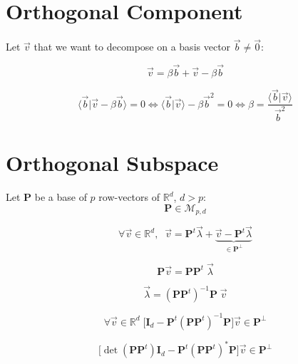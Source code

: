 \documentclass[aps,12pt]{revtex4}
\begin{document}
\section{Orthogonal Component}
Let $\vec{v}$ that we want to decompose on a basis vector $\vec{b} \not= \vec{0}$:

\begin{equation}
	\vec{v} = \beta \vec{b} + \vec{v} - \beta \vec{b}
\end{equation}

\begin{equation}
	\langle	\vec{b} \vert \vec{v} - \beta \vec{b}\rangle = 0 \iff \langle \vec{b} \vert \vec{v} \rangle - \beta \vec{b}^2 = 0
	\iff \beta = \dfrac{\langle \vec{b} \vert \vec{v} \rangle}{\vec{b}^2}
\end{equation}


\section{Orthogonal Subspace}

Let $\bm{P}$ be a base of $p$ row-vectors of $\mathbb{R}^d$, $d>p$:
\begin{equation}
	\bm{P} \in \mathcal{M}_{p,d}
\end{equation}

\begin{equation}
\forall \vec{v} \in \mathbb{R}^d,\;\; \vec{v} = \bm{P}^t \vec{\lambda} +  \underbrace{\vec v  - \bm{P}^t \vec \lambda}_{\in \bm{P}^\perp} %
\end{equation}

\begin{equation}
	\bm{P} \vec v = \bm{P} \bm{P}^t \; \vec{\lambda}
\end{equation}

\begin{equation}
	\vec \lambda = (\bm{P} \bm{P}^t)^{-1} \bm{P}\; \vec v 
\end{equation}

\begin{equation}
	\forall \vec{v} \in  \mathbb{R}^d \; \lbrack \bm{I}_d - \bm{P}^t (\bm{P} \bm{P}^t)^{-1} \bm{P} \rbrack \vec v \in \bm{P}^\perp
\end{equation}
	
\begin{equation}
	\lbrack \det(\bm{P} \bm{P}^t) \bm{I}_d - \bm{P}^t (\bm{P} \bm{P}^t)^{\ast} \bm{P} \rbrack \vec v \in \bm{P}^\perp
\end{equation}
\end{document}
